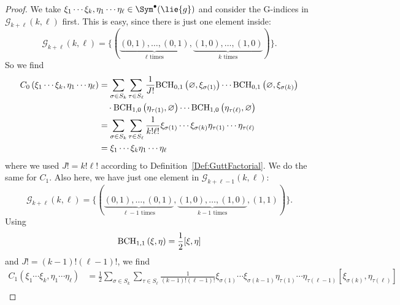\begin{proof}
	We take $\xi_1 \cdots \xi_k, \eta_1 \cdots \eta_{\ell} \in \Sym^{\bullet}
	(\lie{g})$ and consider the 	G-indices in $\mathcal{G}_{k + \ell}(k, \ell)$ 
	first. This is easy, since there is just one element inside:
	\begin{equation*}
		\mathcal{G}_{k + \ell}(k, \ell)
		=
		\Big\{
			( 
				\underbrace{(0,1), \ldots, (0,1)}_{
				\ell \text{ times}
				}
				,
				\underbrace{(1,0), \ldots, (1,0)}_{
				k \text{ times}
				}
			)
		\Big\}.
	\end{equation*}
	So we find
	\begin{align*}
		C_0 
		\left(
			\xi_1 \cdots \xi_k, \eta_1 \cdots \eta_{\ell}
		\right)
		& =
		\sum\limits_{\sigma \in S_k}
		\sum\limits_{\tau \in S_{\ell}}
		\frac{1}{J!}
		\mathrm{BCH}_{0, 1}\left(\varnothing, \xi_{\sigma(1)}\right)
		\cdots
		\mathrm{BCH}_{0, 1}\left(\varnothing, \xi_{\sigma(k)}\right)
		\\
		& \quad \cdot
		\mathrm{BCH}_{1, 0}\left(\eta_{\tau(1)}, \varnothing\right)
		\cdots
		\mathrm{BCH}_{1, 0}\left(\eta_{\tau(\ell)}, \varnothing\right)
		\\
		& =
		\sum\limits_{\sigma \in S_k}
		\sum\limits_{\tau \in S_{\ell}}
		\frac{1}{k! \ell!}
		\xi_{\sigma(1)} \cdots \xi_{\sigma(k)}
		\eta_{\tau(1)} \cdots \eta_{\tau(\ell)}
		\\
		& =
		\xi_1 \cdots \xi_k
		\eta_1 \cdots \eta_{\ell}
	\end{align*}
	where we used $J! = k! \ell!$  according to 
	Definition~\ref{Def:GuttFactorial}. We do the same for $C_1$. Also 
	here, we have just one element in $\mathcal{G}_{k + \ell - 1}(k, \ell)$:
		\begin{equation*}
		\mathcal{G}_{k + \ell}(k, \ell)
		=
		\Big\{
			( 
				\underbrace{(0,1), \ldots, (0,1)}_{
				\ell-1 \text{ times}
				}
				,
				\underbrace{(1,0), \ldots, (1,0)}_{
				k-1 \text{ times}
				}
				,
				(1,1)
			)
		\Big\}.
	\end{equation*}
	Using
	\begin{equation*}
		\mathrm{BCH}_{1, 1}\left(\xi, \eta\right)
		=
		\frac{1}{2} [\xi, \eta]
	\end{equation*}
	and $J! = (k - 1)! (\ell - 1)!$, we find
	\begin{align*}
		C_1 
		\left(
			\xi_1 \cdots \xi_k, \eta_1 \cdots \eta_{\ell}
		\right)
		& =
		\frac{1}{2}
		\sum\limits_{\sigma \in S_k}
		\sum\limits_{\tau \in S_{\ell}}
		\frac{1}{(k-1)! (\ell-1)!}
		\xi_{\sigma(1)} \cdots \xi_{\sigma(k-1)}
		\eta_{\tau(1)} \cdots \eta_{\tau(\ell-1)}
		[\xi_{\sigma(k)}, \eta_{\tau(\ell)}]
		\\

\end{align*}
\end{proof}
